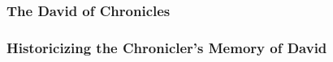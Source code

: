 \subsubsection{The David of Chronicles}


\subsubsection{Historicizing the Chronicler's Memory of David}

